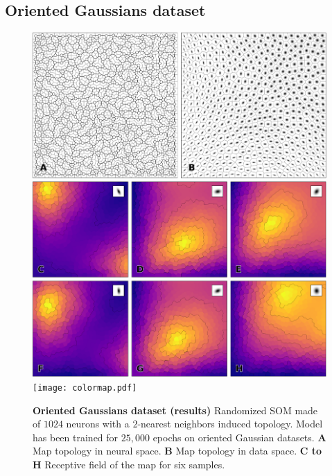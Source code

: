 \subsection{Oriented Gaussians dataset}


\begin{figure}
  \includegraphics[width=\columnwidth]{experiment-Gaussians.pdf}
  \vspace{2mm}
  \texttt{[image: colormap.pdf]}
  \caption{%
  {\bfseries \sffamily Oriented Gaussians dataset (results)}
  Randomized SOM made of $1024$ neurons with a $2$-nearest neighbors induced topology. Model has been trained for $25,000$ epochs on oriented Gaussian datasets. \textbf{A} Map topology in neural space. \textbf{B} Map topology in data space. \textbf{C to H} Receptive field of the map for six samples.
  }
  \label{fig:gaussians:results}
\end{figure}
